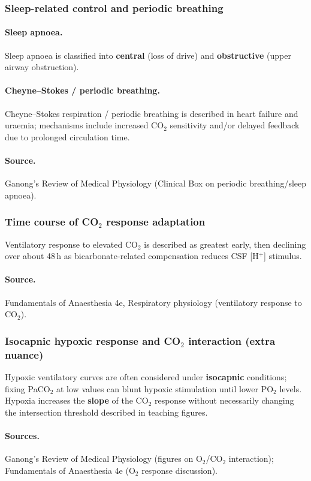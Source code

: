 \documentclass[11pt,a4paper]{article}
\begin{document}
\subsubsection{Sleep-related control and periodic breathing}
\paragraph{Sleep apnoea.}
Sleep apnoea is classified into \textbf{central} (loss of drive) and \textbf{obstructive} (upper airway obstruction).
\paragraph{Cheyne--Stokes / periodic breathing.}
Cheyne--Stokes respiration / periodic breathing is described in heart failure and uraemia; mechanisms include increased CO$_2$ sensitivity and/or delayed feedback due to prolonged circulation time.
\paragraph{Source.}
Ganong’s Review of Medical Physiology (Clinical Box on periodic breathing/sleep apnoea).

\subsubsection{Time course of CO$_2$ response adaptation}
Ventilatory response to elevated CO$_2$ is described as greatest early, then declining over about 48\,h as bicarbonate-related compensation reduces CSF [H$^+$] stimulus.
\paragraph{Source.}
Fundamentals of Anaesthesia 4e, Respiratory physiology (ventilatory response to CO$_2$).

\subsubsection{Isocapnic hypoxic response and CO$_2$ interaction (extra nuance)}
Hypoxic ventilatory curves are often considered under \textbf{isocapnic} conditions; fixing PaCO$_2$ at low values can blunt hypoxic stimulation until lower PO$_2$ levels. Hypoxia increases the \textbf{slope} of the CO$_2$ response without necessarily changing the intersection threshold described in teaching figures.
\paragraph{Sources.}
Ganong’s Review of Medical Physiology (figures on O$_2$/CO$_2$ interaction); Fundamentals of Anaesthesia 4e (O$_2$ response discussion).
\end{document}
